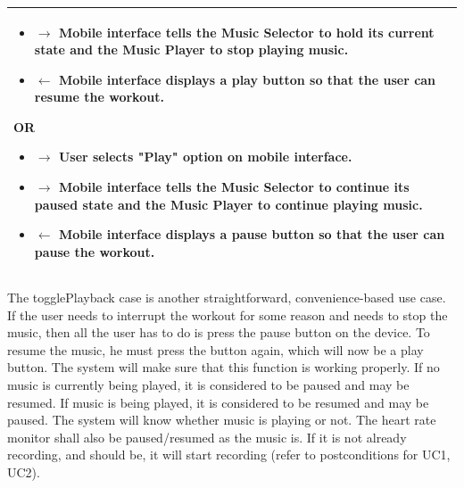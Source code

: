 \documentclass[letterpaper,english, 12pt]{scrreprt}
\begin{document}
\begin{center}
\begin{tabular}{|C{15cm}|}
\begin{itemize}
					\item $\rightarrow$ Mobile interface tells the Music Selector to hold its current state and the Music Player to stop playing music.
                                        \item $\leftarrow$ Mobile interface displays a play button so that the user can resume the workout.
                                \end{itemize}
				OR
				\begin{itemize}
					\item $\rightarrow$ User selects "Play" option on mobile interface.
					\item $\rightarrow$ Mobile interface tells the Music Selector to continue its paused state and the Music Player to continue playing music.
					\item $\leftarrow$ Mobile interface displays a pause button so that the user can pause the workout.
				\end{itemize}
                \\
				\hline
        \end{tabular}
\end{center}

The togglePlayback case is another straightforward, convenience-based use case. If the user needs to interrupt the workout for some reason and needs to stop the music, then all the user has to do is press the pause button on the device. To resume the music, he must press the button again, which will now be a play button. The system will make sure that this function is working properly. If no music is currently being played, it is considered to be paused and may be resumed. If music is being played, it is considered to be resumed and may be paused. The system will know whether music is playing or not. The heart rate monitor shall also be paused/resumed as the music is. If it is not already recording, and should be, it will start recording (refer to postconditions for UC1, UC2).
\end{document}
